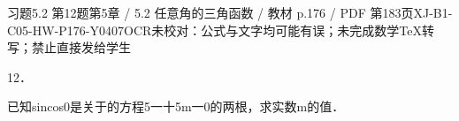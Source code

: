 \begin{bankitem}{习题5.2 第12题}{第5章 / 5.2 任意角的三角函数 / 教材 p.176 / PDF 第183页}{XJ-B1-C05-HW-P176-Y0407}{OCR未校对：公式与文字均可能有误；未完成数学TeX转写；禁止直接发给学生}
\begin{ocrdraft}
\par
12．
\par
已知sincos0是关于的方程5一十5m一0的两根，求实数m的值．
\end{ocrdraft}
\end{bankitem}
